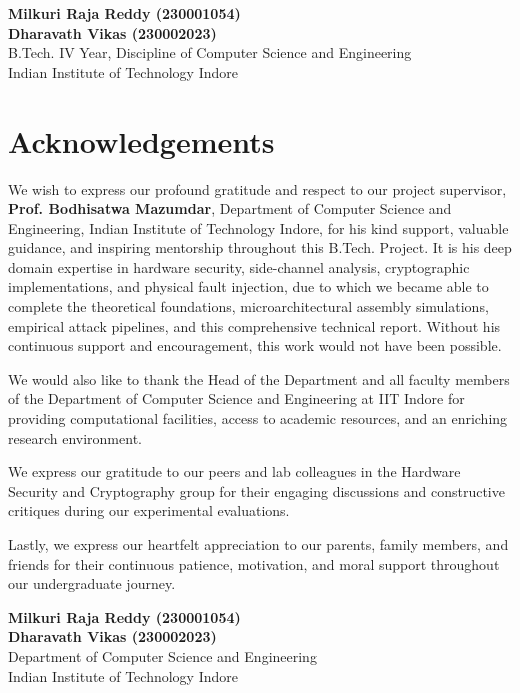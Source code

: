 \vspace{1.5cm}
\noindent
\textbf{Milkuri Raja Reddy (230001054)} \\
\textbf{Dharavath Vikas (230002023)} \\
B.Tech. IV Year, Discipline of Computer Science and Engineering \\
Indian Institute of Technology Indore

\cleardoublepage

\chapter*{Acknowledgements}

We wish to express our profound gratitude and respect to our project supervisor, \textbf{Prof. Bodhisatwa Mazumdar}, Department of Computer Science and Engineering, Indian Institute of Technology Indore, for his kind support, valuable guidance, and inspiring mentorship throughout this B.Tech. Project. It is his deep domain expertise in hardware security, side-channel analysis, cryptographic implementations, and physical fault injection, due to which we became able to complete the theoretical foundations, microarchitectural assembly simulations, empirical attack pipelines, and this comprehensive technical report. Without his continuous support and encouragement, this work would not have been possible.

We would also like to thank the Head of the Department and all faculty members of the Department of Computer Science and Engineering at IIT Indore for providing computational facilities, access to academic resources, and an enriching research environment.

We express our gratitude to our peers and lab colleagues in the Hardware Security and Cryptography group for their engaging discussions and constructive critiques during our experimental evaluations.

Lastly, we express our heartfelt appreciation to our parents, family members, and friends for their continuous patience, motivation, and moral support throughout our undergraduate journey.

\vspace{1.5cm}
\noindent
\textbf{Milkuri Raja Reddy (230001054)} \\
\textbf{Dharavath Vikas (230002023)} \\
Department of Computer Science and Engineering \\
Indian Institute of Technology Indore

